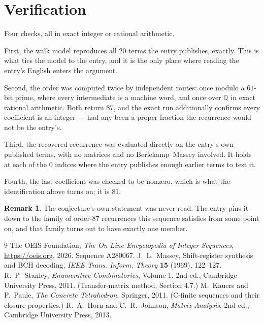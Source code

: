 \documentclass[11pt,a4paper]{article}
\theoremstyle{plain}
\theoremstyle{definition}
\newtheorem{remark}[theorem]{Remark}
\begin{document}
\section{Verification}

Four checks, all in exact integer or rational arithmetic.

First, the walk model reproduces all $20$ terms the entry publishes, exactly. This is
what ties the model to the entry, and it is the only place where reading the entry's English
enters the argument.

Second, the order was computed twice by independent routes: once modulo a $61$-bit prime, where
every intermediate is a machine word, and once over $\mathbb{Q}$ in exact rational arithmetic.
Both return $87$, and the exact run additionally confirms every coefficient is an integer
--- had any been a proper fraction the recurrence would not be the entry's.

Third, the recovered recurrence was evaluated directly on the entry's own published terms, with
no matrices and no Berlekamp--Massey involved. It holds at each of the $0$ indices where
the entry publishes enough earlier terms to test it.

Fourth, the last coefficient was checked to be nonzero, which is what the identification above
turns on; it is $81$.

\begin{remark}
The conjecture's own statement was never read. The entry pins it down to the family of
order-$87$ recurrences this sequence satisfies from some point on, and that family turns
out to have exactly one member.
\end{remark}

\begin{thebibliography}{9}
 The OEIS Foundation, \emph{The On-Line Encyclopedia of Integer
Sequences}, \url{https://oeis.org}, 2026. Sequence A280067.
 J.~L.~Massey, Shift-register synthesis and BCH decoding, \emph{IEEE
Trans. Inform. Theory} \textbf{15} (1969), 122--127.
 R.~P.~Stanley, \emph{Enumerative Combinatorics}, Volume 1, 2nd ed.,
Cambridge University Press, 2011. (Transfer-matrix method, Section 4.7.)
 M.~Kauers and P.~Paule, \emph{The Concrete Tetrahedron}, Springer, 2011.
(C-finite sequences and their closure properties.)
 R.~A.~Horn and C.~R.~Johnson, \emph{Matrix Analysis}, 2nd ed., Cambridge
University Press, 2013.
\end{thebibliography}
\end{document}
